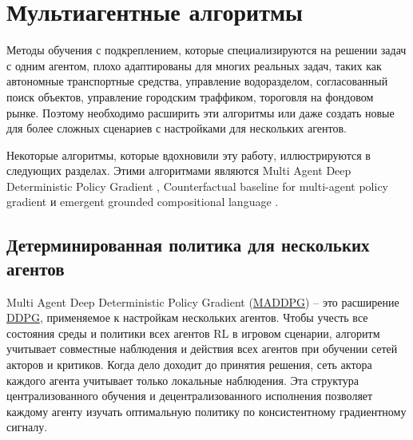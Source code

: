 \section{Мультиагентные алгоритмы} \label{ch2:ma-algs} %

Методы обучения с подкреплением, которые специализируются на решении задач с одним агентом, плохо адаптированы для многих реальных задач, таких как автономные транспортные средства, управление водоразделом, согласованный поиск объектов, управление городским траффиком, тороговля на фондовом рынке. Поэтому необходимо расширить эти алгоритмы или даже создать новые для более сложных сценариев с настройками для нескольких агентов.

Некоторые алгоритмы, которые вдохновили эту работу, иллюстрируются в следующих разделах. Этими алгоритмами являются Multi Agent Deep Deterministic Policy Gradient \cite{lowe2017multiagent}, Counterfactual baseline for multi-agent policy gradient \cite{foerster2017counterfactual} и emergent grounded compositional language \cite{mordatch2017emergence}.

\subsection{Детерминированная политика для нескольких агентов}

Multi Agent Deep Deterministic Policy Gradient (\hyperref[acr:maddpg]{MADDPG}) -- это расширение \hyperref[acr:ddpg]{DDPG}, применяемое к настройкам нескольких агентов. Чтобы учесть все состояния среды и политики всех агентов RL в игровом сценарии, алгоритм учитывает совместные наблюдения и действия всех агентов при обучении сетей акторов и критиков. Когда дело доходит до принятия решения, сеть актора каждого агента учитывает только локальные наблюдения. Эта структура централизованного обучения и децентрализованного исполнения позволяет каждому агенту изучать оптимальную политику по консистентному градиентному сигналу. \cite{lowe2017multiagent}

